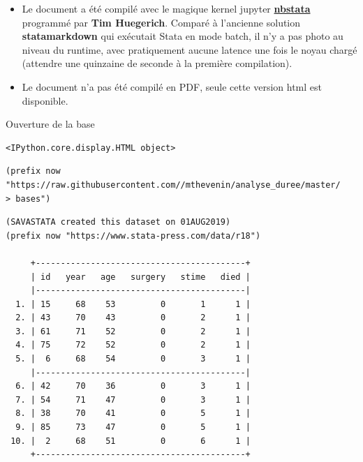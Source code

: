 \documentclass[
  12pt,
  letterpaper,
  DIV=11,
  numbers=noendperiod,
  onepage,
  openany]{scrreprt}
\providecommand{\tightlist}{%
  \setlength{\itemsep}{0pt}\setlength{\parskip}{0pt}}\usepackage{longtable,booktabs,array}
\begin{document}
\begin{tcolorbox}[enhanced jigsaw, arc=.35mm, bottomrule=.15mm, titlerule=0mm, colbacktitle=quarto-callout-note-color!10!white, left=2mm, opacitybacktitle=0.6, toprule=.15mm, title=\textcolor{quarto-callout-note-color}{\faInfo}\hspace{0.5em}{Note}, colframe=quarto-callout-note-color-frame, breakable, coltitle=black, opacityback=0, toptitle=1mm, bottomtitle=1mm, rightrule=.15mm, leftrule=.75mm, colback=white]

\begin{itemize}
\tightlist
\item
  Le document a été compilé avec le magique kernel jupyter
  \href{https://github.com/hugetim/nbstata}{\textbf{nbstata}} programmé
  par \textbf{Tim Huegerich}. Comparé à l'ancienne solution
  \textbf{statamarkdown} qui exécutait Stata en mode batch, il n'y a pas
  photo au niveau du runtime, avec pratiquement aucune latence une fois
  le noyau chargé (attendre une quinzaine de seconde à la première
  compilation).
\item
  Le document n'a pas été compilé en PDF, seule cette version html est
  disponible.
\end{itemize}

\end{tcolorbox}

Ouverture de la base

\begin{verbatim}
<IPython.core.display.HTML object>
\end{verbatim}

\begin{verbatim}
(prefix now "https://raw.githubusercontent.com//mthevenin/analyse_duree/master/
> bases")
\end{verbatim}

\begin{verbatim}
(SAVASTATA created this dataset on 01AUG2019)
(prefix now "https://www.stata-press.com/data/r18")

     +------------------------------------------+
     | id   year   age   surgery   stime   died |
     |------------------------------------------|
  1. | 15     68    53         0       1      1 |
  2. | 43     70    43         0       2      1 |
  3. | 61     71    52         0       2      1 |
  4. | 75     72    52         0       2      1 |
  5. |  6     68    54         0       3      1 |
     |------------------------------------------|
  6. | 42     70    36         0       3      1 |
  7. | 54     71    47         0       3      1 |
  8. | 38     70    41         0       5      1 |
  9. | 85     73    47         0       5      1 |
 10. |  2     68    51         0       6      1 |
     +------------------------------------------+
\end{verbatim}
\end{document}
